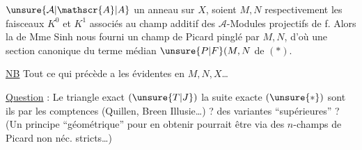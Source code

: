 
\uline{}\unsure{:|,}  $\unsure{\mathcal{A}|\mathscr{A}|A}$ un anneau sur $X$, soient $M,N$ respectivement les faisceaux $K^{0}$ et $K^{1}$ associés au champ additif des $\mathcal{A}$-Modules projectifs de  f.  Alors la  de Mme Sinh nous fourni un champ de Picard pinglé par $M,N$, d'où une section  canonique du terme médian $\unsure{P|F}(M,N$ de $(*)$.

\uline{NB} Tout ce qui précède a les  évidentes en $M,N,X$\ldots

\uline{Question} : Le triangle exact $(\unsure{T|J})$  la suite exacte $(\unsure{*})$ sont ils  par les comptences (Quillen, Breen Illusie\ldots) ?  des variantes ``supérieures'' ? (Un principe ``géométrique'' pour en obtenir pourrait être via des $n$-champs de Picard non néc. stricts\ldots)

